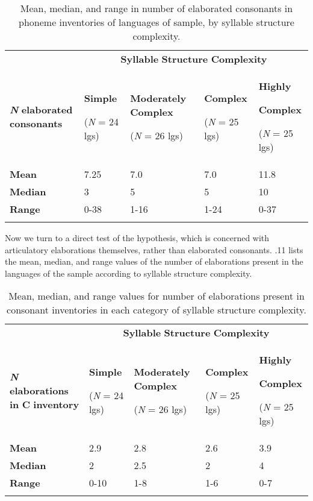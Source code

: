 \begin{table}
\begin{tabularx}{\textwidth}{XXXXX}
 & \multicolumn{4}{c}{ \textbf{Syllable} \textbf{Structure} \textbf{Complexity}}\\
\lsptoprule
\textbf{\textit{N}} \textbf{elaborated} \textbf{consonants} & { \textbf{Simple}}

 (\textit{N} = 24 lgs) & { \textbf{Moderately} \textbf{Complex}}

 (\textit{N} = 26 lgs) & { \textbf{Complex}}

 (\textit{N} = 25 lgs) & { \textbf{Highly} }

{ \textbf{Complex}}

 (\textit{N} = 25 lgs)\\
\textbf{Mean} & 7.25 & 7.0 & 7.0 & 11.8\\
\textbf{Median} & 3 & 5 & 5 & 10\\
\textbf{Range} & 0-38 & 1-16 & 1-24 & 0-37\\
\lspbottomrule
\end{tabularx}
\caption{\label{4.10}Mean, median, and range in number of elaborated consonants in phoneme inventories of languages of sample, by syllable structure complexity.}
\end{table}

  Now we turn to a direct test of the hypothesis, which is concerned with articulatory elaborations themselves, rather than elaborated consonants. .11 lists the mean, median, and range values of the number of elaborations present in the languages of the sample according to syllable structure complexity.

\begin{table}
\begin{tabularx}{\textwidth}{XXXXX}
 & \multicolumn{4}{c}{ \textbf{Syllable} \textbf{Structure} \textbf{Complexity}}\\
\lsptoprule
\textbf{\textit{N}} \textbf{elaborations} \textbf{in} \textbf{C} \textbf{inventory} & { \textbf{Simple}}

 (\textit{N} = 24 lgs) & { \textbf{Moderately} \textbf{Complex}}

 (\textit{N} = 26 lgs) & { \textbf{Complex}}

 (\textit{N} = 25 lgs) & { \textbf{Highly} }

{ \textbf{Complex}}

 (\textit{N} = 25 lgs)\\
\textbf{Mean} & 2.9 & 2.8 & 2.6 & 3.9\\
\textbf{Median} & 2 & 2.5 & 2 & 4\\
\textbf{Range} & 0-10 & 1-8 & 1-6 & 0-7\\
\lspbottomrule
\end{tabularx}
\caption{\label{4.11}Mean, median, and range values for number of elaborations present in consonant inventories in each category of syllable structure complexity.}
\end{table}

